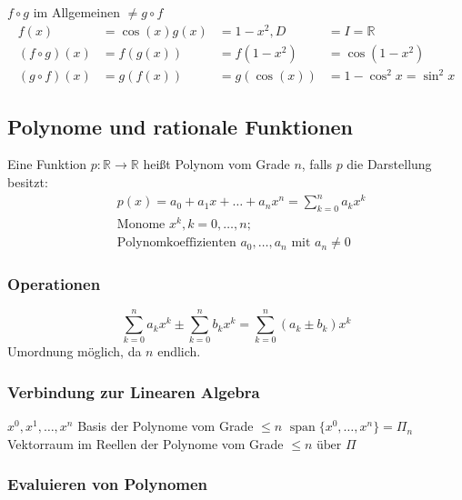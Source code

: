 \begin{note} \(f \circ g \) im Allgemeinen \( \neq g \circ f \)
	\begin{align*}
		f(x) &= \cos(x) g(x) &= 1-x^2, D &= I=\mathbb{R} \\
		(f \circ g)(x) &= f(g(x)) &= f(1-x^2) &= \cos(1-x^2) \\
		(g \circ f)(x) &= g(f(x)) &= g(\cos(x)) &= 1-\cos^2x = \sin^2x 
	\end{align*}	
\end{note}


\subsection{Polynome und rationale Funktionen} %
\label{sub:polyFunk}

Eine Funktion \( p:\mathbb{R} \rightarrow \mathbb{R} \) heißt Polynom vom Grade $n$, falls $p$ die Darstellung besitzt:
\begin{align*}
	&p(x)=a_0+a_1x+\ldots+a_n x^n = \sum_{k=0}^{n} a_kx^k\\
	&\text{Monome }x^k, k=0,\ldots,n; \\
	&\text{Polynomkoeffizienten }a_0,\ldots,a_n \text{ mit } a_n \neq 0
\end{align*}

\subsubsection*{Operationen} %
\label{ssub:polyOp}

\[
  \sum_{k=0}^{n}  a_kx^k  \pm
  \sum_{k=0}^{n}  b_kx^k  =
  \sum_{k=0}^{n}  (a_k \pm b_k)x^k 
\]
Umordnung möglich, da \( n \) endlich.

\subsubsection*{Verbindung zur Linearen Algebra} %
\label{ssub:polyLinAlg}
\( x^0,x^1,\ldots,x^n \) Basis der Polynome vom Grade \( \leq n \) \newline
\( \operatorname{span} \{x^0 ,\ldots,x^n\}=\Pi_n \) Vektorraum im Reellen der Polynome vom Grade \( \leq n \text{ über } \Pi \)


\subsubsection*{Evaluieren von Polynomen} %
\label{ssub:evaluieren_von_polynomen}

